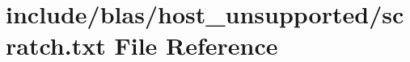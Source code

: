 \hypertarget{host__unsupported_2scratch_8txt}{}\section{include/blas/host\+\_\+unsupported/scratch.txt File Reference}
\label{host__unsupported_2scratch_8txt}
